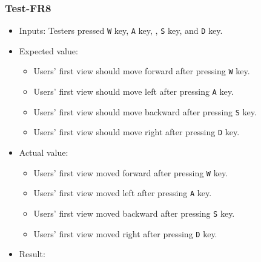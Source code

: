 \documentclass[12pt, titlepage]{article}
\begin{document}
\subsubsection{Test-FR8}
\begin{itemize}
\item Inputs: Testers pressed \verb|W| key,  \verb|A| key, 
, \verb|S| key, and \verb|D| key.
\item Expected value: 
\begin{itemize}
\item Users’ first view should move forward after pressing \verb|W|
key.
\item Users’ first view should move left after pressing \verb|A|
key.
\item Users’ first view should move backward after pressing \verb|S|
key.
\item Users’ first view should move right after pressing \verb|D|
key.
\end{itemize}
\item Actual value: 
\begin{itemize}
\item Users’ first view moved forward after pressing \verb|W|
key.
\item Users’ first view moved left after pressing \verb|A|
key.
\item Users’ first view moved backward after pressing \verb|S|
key.
\item Users’ first view moved right after pressing \verb|D|
key.
\end{itemize}
\item Result: \pass
\end{itemize}

\end{document}
